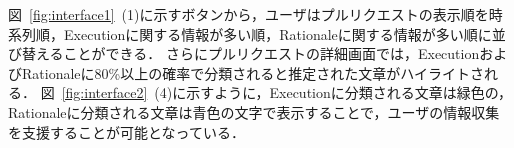 
図~\ref{fig:interface1}~(1)に示すボタンから，ユーザはプルリクエストの表示順を時系列順，Executionに関する情報が多い順，Rationaleに関する情報が多い順に並び替えることができる．
さらにプルリクエストの詳細画面では，ExecutionおよびRationaleに80\%以上の確率で分類されると推定された文章がハイライトされる．
図~\ref{fig:interface2}~(4)に示すように，Executionに分類される文章は緑色の，Rationaleに分類される文章は青色の文字で表示することで，ユーザの情報収集を支援することが可能となっている．


